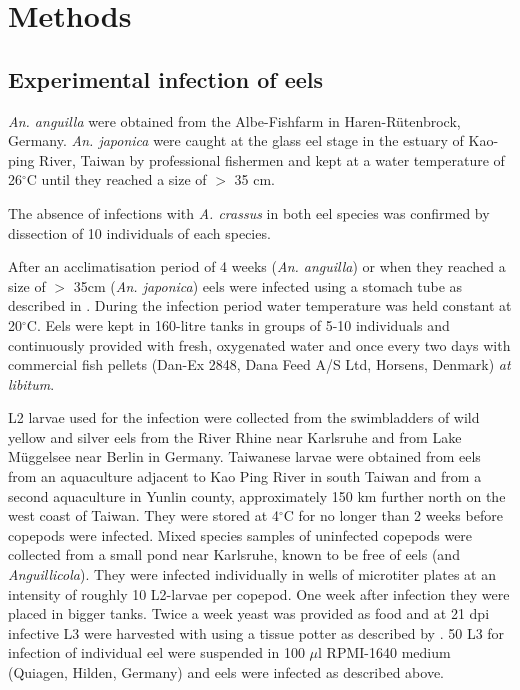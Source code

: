 \documentclass[10pt]{article}
\begin{document}
\section{Methods}

\subsection{Experimental infection of eels}

\textit{An. anguilla} were obtained from the Albe-Fishfarm in
Haren-R\"utenbrock, Germany. \textit{An. japonica} were caught at the
glass eel stage in the estuary of Kao-ping River, Taiwan by
professional fishermen and kept at a water temperature of
26$^{\circ}$C until they reached a size of $>$ 35 cm.

The absence of infections with \textit{A. crassus} in both eel species
was confirmed by dissection of 10 individuals of each species.

After an acclimatisation period of 4 weeks (\textit{An. anguilla}) or
when they reached a size of $>$ 35cm (\textit{An. japonica}) eels were
infected using a stomach tube as described in
\cite{boon1990effect}. During the infection period water temperature
was held constant at 20$^{\circ}$C. Eels were kept in 160-litre tanks
in groups of 5-10 individuals and continuously provided with fresh,
oxygenated water and once every two days with commercial fish pellets
(Dan-Ex 2848, Dana Feed A/S Ltd, Horsens, Denmark) \textit{at
  libitum}.

L2 larvae used for the infection were collected from the swimbladders
of wild yellow and silver eels from the River Rhine near Karlsruhe and
from Lake M\"uggelsee near Berlin in Germany. Taiwanese larvae were
obtained from eels from an aquaculture adjacent to Kao Ping River in
south Taiwan and from a second aquaculture in Yunlin county,
approximately 150 km further north on the west coast of Taiwan. They
were stored at 4$^{\circ}$C for no longer than 2 weeks before copepods
were infected. Mixed species samples of uninfected copepods were
collected from a small pond near Karlsruhe, known to be free of eels
(and \textit{Anguillicola}). They were infected individually in wells
of microtiter plates at an intensity of roughly 10 L2-larvae per
copepod. One week after infection they were placed in bigger
tanks. Twice a week yeast was provided as food and at 21 dpi infective
L3 were harvested with using a tissue potter as described by
\cite{haenen_improved_1994}. 50 L3 for infection of individual eel
were suspended in 100 $\mu$l RPMI-1640 medium (Quiagen, Hilden,
Germany) and eels were infected as described above.
\end{document}
